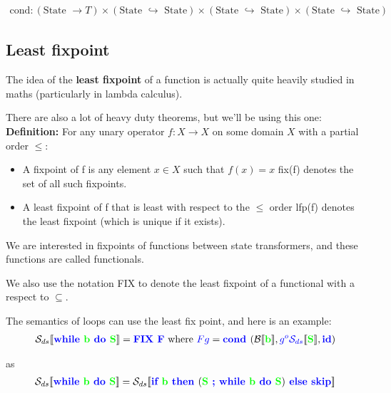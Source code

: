 \documentclass[11pt,a4paper,titlepage,dvipsnames,cmyk]{scrartcl}
\newcommand\pfun{\hookrightarrow}
\begin{document}
\begin{align*}
    \text{cond} : (\text{State } \rightarrow T) \times (\text{State }
    \pfun \text{ State}) \times (\text{State }
    \pfun \text{ State})\times (\text{State }
    \pfun \text{ State})
\end{align*}

\subsection{Least fixpoint}%
\label{sub:least-fixpoint}
The idea of the \textbf{least fixpoint} of a function is actually quite
heavily studied in maths (particularly in lambda calculus).

There are also a lot of heavy duty theorems, but we'll be using this one:
\textbf{Definition:} For any unary operator $f : X \rightarrow X$ on some
domain $X$ with a partial order $\le:$
\begin{itemize}
    \item A {\color{red}fixpoint} of f is any element $x \in X$ such that
        $f(x) = x$ {\color{green}fix(f)} denotes the set of all such
        fixpoints.
    \item A {\color{red}least} fixpoint of f that is least with respect
        to the $\le$ order {\color{green}lfp(f)} denotes the least
        fixpoint (which is unique if it exists).
\end{itemize}

We are interested in  fixpoints of functions between state transformers,
and these functions are called functionals.

We also use the notation {\color{red}FIX} to denote the least fixpoint of
a functional with a respect to $\subseteq$.

The semantics of loops can use the least fix point, and here is an
example:
\begin{align*}
    \mathcal{S}_{ds}[\![ {\color{blue}\textbf{while }} {\color{green}
    \textbf{b }} {\color{blue} \textbf{do }} {\color{green} \textbf{S}}
    ]\!] =
    {\color{blue} \textbf{FIX F}} \text{ where } {\color{blue}F g} =
    {\color{blue} \textbf{cond }} (\mathcal{B} [\![ {\color{green}
    \textbf{b}} ]\!], {\color{blue} g ^o \mathcal{S}_{ds}} [\![
    {\color{green} \textbf{S}} ]\!], {\color{blue} \textbf{id}})
\end{align*}

as
\begin{align*}
    \mathcal{S}_{ds}[\![ {\color{blue}\textbf{while }} {\color{green}
    \textbf{b }} {\color{blue} \textbf{do }} {\color{green} \textbf{S}}
    ]\!] =\mathcal{S}_{ds}[\![ {\color{blue} \textbf{if }} {\color{green}
    \textbf{b }} {\color{blue} \textbf{then }} ( {\color{green} \textbf{S
}} {\color{blue} \textbf{; while }} {\color{green} \textbf{b }}
{\color{blue} \textbf{do }} {\color{green} \textbf{S}}) {\color{blue}
\textbf{ else skip}} ]\!]
\end{align*}
\end{document}

